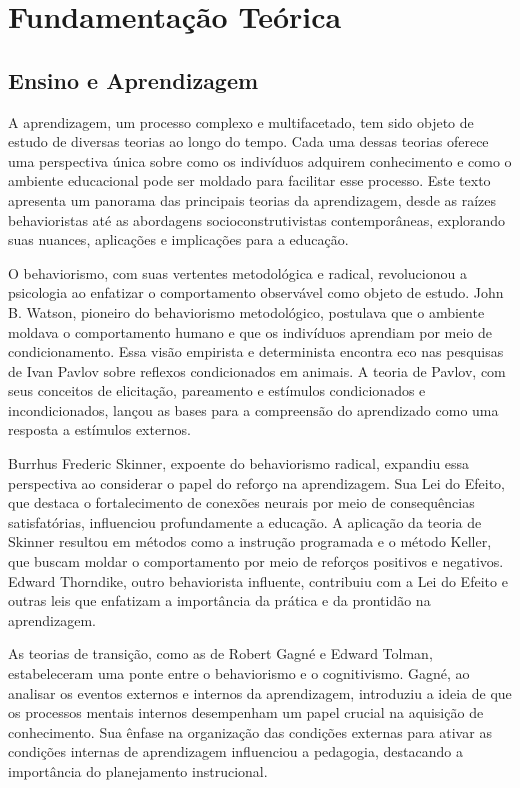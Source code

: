 \chapter{Fundamentação Teórica}\label{chp:rev}
\section{Ensino e Aprendizagem}

A aprendizagem, um processo complexo e multifacetado, tem sido objeto de estudo de diversas teorias ao longo do tempo. Cada uma dessas teorias oferece uma perspectiva única sobre como os indivíduos adquirem conhecimento e como o ambiente educacional pode ser moldado para facilitar esse processo. Este texto apresenta um panorama das principais teorias da aprendizagem, desde as raízes behavioristas até as abordagens socioconstrutivistas contemporâneas, explorando suas nuances, aplicações e implicações para a educação.

O behaviorismo, com suas vertentes metodológica e radical, revolucionou a psicologia ao enfatizar o comportamento observável como objeto de estudo. John B. Watson, pioneiro do behaviorismo metodológico, postulava que o ambiente moldava o comportamento humano e que os indivíduos aprendiam por meio de condicionamento. Essa visão empirista e determinista encontra eco nas pesquisas de Ivan Pavlov sobre reflexos condicionados em animais. A teoria de Pavlov, com seus conceitos de elicitação, pareamento e estímulos condicionados e incondicionados, lançou as bases para a compreensão do aprendizado como uma resposta a estímulos externos.

Burrhus Frederic Skinner, expoente do behaviorismo radical, expandiu essa perspectiva ao considerar o papel do reforço na aprendizagem. Sua Lei do Efeito, que destaca o fortalecimento de conexões neurais por meio de consequências satisfatórias, influenciou profundamente a educação. A aplicação da teoria de Skinner resultou em métodos como a instrução programada e o método Keller, que buscam moldar o comportamento por meio de reforços positivos e negativos. Edward Thorndike, outro behaviorista influente, contribuiu com a Lei do Efeito e outras leis que enfatizam a importância da prática e da prontidão na aprendizagem.

As teorias de transição, como as de Robert Gagné e Edward Tolman, estabeleceram uma ponte entre o behaviorismo e o cognitivismo. Gagné, ao analisar os eventos externos e internos da aprendizagem, introduziu a ideia de que os processos mentais internos desempenham um papel crucial na aquisição de conhecimento. Sua ênfase na organização das condições externas para ativar as condições internas de aprendizagem influenciou a pedagogia, destacando a importância do planejamento instrucional.

